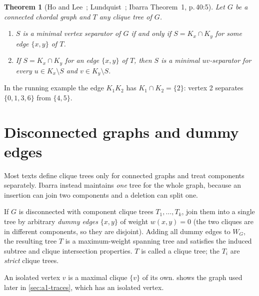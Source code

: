 \documentclass[11pt,a4paper,oneside]{report}
\theoremstyle{plain}
\newtheorem{theorem}{Theorem}[chapter]
\theoremstyle{definition}
\theoremstyle{remark}
\begin{document}
\begin{theorem}[Ho and Lee~\cite{holee1989}; Lundquist~\cite{lundquist1990}; Ibarra Theorem~1, p.\,40:5]\label{thm:separators}
Let \(G\) be a connected chordal graph and \(T\) any clique tree of \(G\).
\begin{enumerate}
\item \(S\) is a minimal vertex separator of \(G\) if and only if \(S=K_x\cap K_y\) for some
  edge \(\{x,y\}\) of \(T\).
\item If \(S=K_x\cap K_y\) for an edge \(\{x,y\}\) of \(T\), then \(S\) is a minimal
  \(uv\)-separator for every \(u\in K_x\setminus S\) and \(v\in K_y\setminus S\).
\end{enumerate}
\end{theorem}

In the running example the edge \(K_1K_2\) has \(K_1\cap K_2=\{2\}\): vertex 2 separates
\(\{0,1,3,6\}\) from \(\{4,5\}\).

\section{Disconnected graphs and dummy edges}\label{sec:dummy-edges}
Most texts define clique trees only for connected graphs and treat components separately.
Ibarra instead maintains \emph{one} tree for the whole graph, because an insertion can join two
components and a deletion can split one.

\begin{paperbox}
If \(G\) is disconnected with component clique trees \(T_1,\dots,T_k\), join them into a single
tree by arbitrary \emph{dummy edges} \(\{x,y\}\) of weight \(w(x,y)=0\) (the two cliques are in
different components, so they are disjoint). Adding all dummy edges to \(W_G\), the resulting
tree \(T\) is a maximum-weight spanning tree and satisfies the induced subtree and clique
intersection properties. \(T\) is called a clique tree; the \(T_i\) are \emph{strict} clique
trees.
\end{paperbox}

An isolated vertex \(v\) is a maximal clique \(\{v\}\) of its own.  shows the
graph used later in \cref{sec:a1-traces}, which has an isolated vertex.
\end{document}
